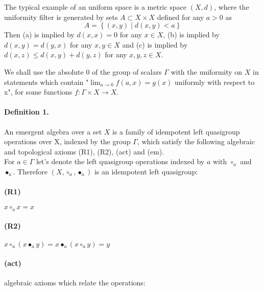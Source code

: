 \documentclass{article}
\begin{document}
The typical example of an uniform space is a metric space $\displaystyle (X,d)$, where the uniformity filter is generated by sets $\displaystyle A \subset X \times X$ defined for any $\displaystyle a > 0$ as
$$A = \left\{ (x,y) \mid d(x,y) < a \right\}$$
Then (a) is implied by $\displaystyle d(x,x) = 0$ for any $x \in X$, (b) is implied by $\displaystyle d(x,y) = d(y,x)$ for any $\displaystyle x,y \in X$ and (c) is implied by $\displaystyle d(x,z) \leq d(x,y) + d(y,z)$ for any $\displaystyle x,y,z \in X$. 

We shall use the absolute $\displaystyle 0$ of the group of scalars $\displaystyle \Gamma$ with the uniformity on $\displaystyle X$ in statements which contain "$\displaystyle \lim_{a \rightarrow 0} f(a,x) = g(x)$ uniformly with respect to x", for some functions $\displaystyle f: \Gamma \times X \rightarrow X$. 


\paragraph{Definition 1.} 
An emergent algebra over a set $\displaystyle X$ is a family of idempotent left quasigroup operations over X, 
indexed by the group $\displaystyle \Gamma$, which satisfy the following algebraic and topological axioms (R1), (R2), (act) and (em). \\


For $\displaystyle a \in \Gamma$ let's denote the left quasigroup operations indexed by $a$ with $\displaystyle \circ_a$ and $\displaystyle \bullet_a$. Therefore 
$\displaystyle (X,\circ_a ,\bullet_a )$ is an idempotent left quasigroup: \\

\paragraph{(R1)} $\displaystyle x \circ_a x = x$ 
 
\paragraph{(R2)} $\displaystyle x \circ_a (x \bullet_a y) = x \bullet_a (x \circ_a y) = y$ \\
   


\paragraph{(act)} algebraic axioms which relate the operations: \\
\end{document}
